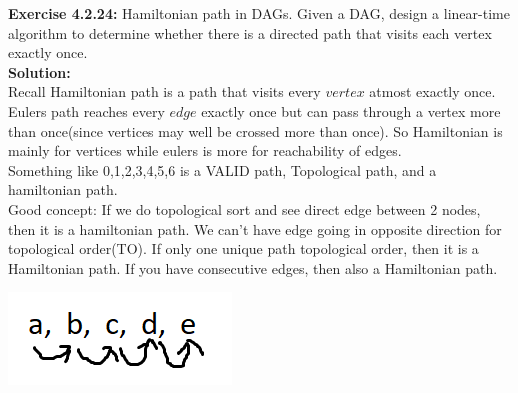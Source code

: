 \documentclass[11pt,fleqn]{article}
\begin{document}
\textbf{Exercise 4.2.24:} Hamiltonian path in DAGs. Given a DAG, design a linear-time algorithm to
determine whether there is a directed path that visits each vertex exactly once.\\

\textbf{Solution:}\\
Recall Hamiltonian path is a path that visits every $vertex$ atmost exactly once. Eulers path reaches every $edge$ exactly once but can pass through a vertex more than once(since vertices may well be crossed more than once). So Hamiltonian is mainly for vertices while eulers is more for reachability of edges.\\

Something like 0,1,2,3,4,5,6 is a VALID path, Topological path, and a hamiltonian path.\\

Good concept: If we do topological sort and see direct edge between 2 nodes, then it is a hamiltonian path. We can't have edge going in opposite direction for topological order(TO). If only one unique path topological order, then it is a Hamiltonian path. If you have consecutive edges, then also a Hamiltonian path.

\begin{center}
	\includegraphics[scale=1]{4.2.24.png}
\end{center}

	
\end{document}
